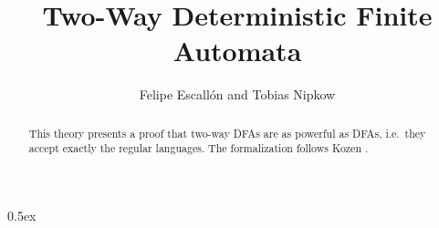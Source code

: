 \documentclass[11pt,a4paper]{article}
\begin{document}
\title{Two-Way Deterministic Finite Automata}
\author{Felipe Escall\'{o}n and Tobias Nipkow}
\maketitle

\begin{abstract}
This theory presents a proof that two-way DFAs are as powerful
as DFAs, i.e.\ they accept exactly the regular languages. The
formalization follows Kozen \cite{Kozen}.
\end{abstract}

\parindent 0pt\parskip 0.5ex





\end{document}
